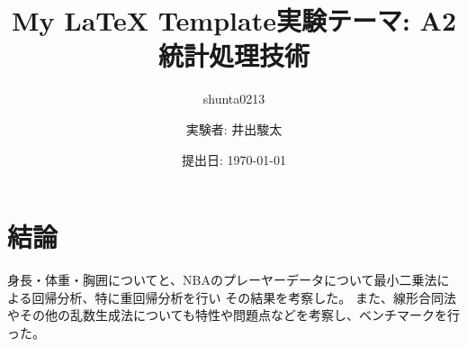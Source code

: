 \documentclass{jlreq}
\title{My {\LaTeX} Template}
\author{shunta0213}
\title{実験テーマ: A2 統計処理技術}
\author{実験者: 井出駿太 }
\date{提出日: \today}
\begin{document}
\maketitle



\clearpage

% 
\clearpage

\clearpage


\section{結論}
身長・体重・胸囲についてと、NBAのプレーヤーデータについて最小二乗法による回帰分析、特に重回帰分析を行い
その結果を考察した。
また、線形合同法やその他の乱数生成法についても特性や問題点などを考察し、ベンチマークを行った。


\clearpage


\clearpage
\printbibliography
\end{document}
